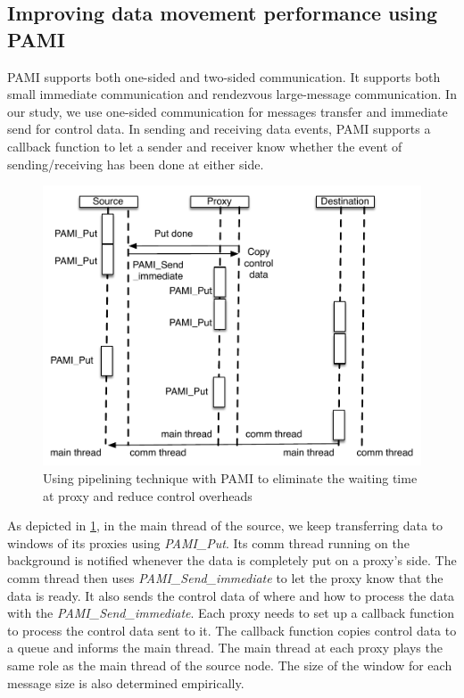 \documentclass[final,5p,times]{elsarticle}
\begin{document}
\subsection{Improving data movement performance using PAMI}
PAMI supports both one-sided and two-sided communication. It supports both small immediate communication and rendezvous large-message communication. In our study, we use one-sided communication for messages transfer and immediate send for control data. In sending and receiving data events, PAMI supports a callback function to let a sender and receiver know whether the event of sending/receiving has been done at either side.

\begin{figure}[!htb]
\centering
\includegraphics[scale=0.5]{pami_pipeline.pdf}
\caption{Using pipelining technique with PAMI to eliminate the waiting time at proxy and reduce control overheads}
\label{fig:pami_pipeline}
\end{figure}

As depicted in \ref{fig:pami_pipeline}, in the main thread of the source, we keep transferring data to windows of its proxies using \textit{PAMI\_Put}. Its comm thread running on the background is notified whenever the data is completely put on a proxy's side. The comm thread then uses \textit{PAMI\_Send\_immediate} to let the proxy know that the data is ready. It also sends the control data of where and how to process the data with the \textit{PAMI\_Send\_immediate}. Each proxy needs to set up a callback function to process the control data sent to it. The callback function copies control data to a queue and informs the main thread. The main thread at each proxy plays the same role as the main thread of the source node. The size of the window for each message size is also determined empirically.
\end{document}
